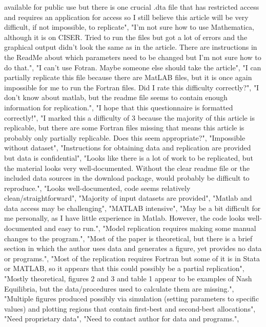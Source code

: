 \documentclass[]{article}
\begin{document}
\begin{itemize}
  available for public use but there is one crucial .dta file that has
  restricted access and requires an application for access so I still
  believe this article will be very difficult, if not impossible, to
  replicate", "I'm not sure how to use Mathematica, although it is on
  CISER. Tried to run the files but got a lot of errors and the
  graphical output didn't look the same as in the article. There are
  instructions in the ReadMe about which parameters need to be changed
  but I'm not sure how to do that.", "I can't use Fotran. Maybe someone
  else should take the article", "I can partially replicate this file
  because there are MatLAB files, but it is once again impossible for me
  to run the Fortran files. Did I rate this difficulty correctly?", "I
  don't know about matlab, but the readme file seems to contain enough
  information for replication.", "I hope that this questionnaire is
  formatted correctly!", "I marked this a difficulty of 3 because the
  majority of this article is replicable, but there are some Fortran
  files missing that means this article is probably only partially
  replicable. Does this seem appropriate?", "Impossible without
  dataset", "Instructions for obtaining data and replication are
  provided but data is confidential", "Looks like there is a lot of work
  to be replicated, but the material looks very well-documented. Without
  the clear readme file or the included data sources in the download
  package, would probably be difficult to reproduce.", "Looks
  well-documented, code seems relatively clean/straightforward",
  "Majority of input datasets are provided", "Matlab and data access may
  be challenging", "MATLAB intensive", "May be a bit difficult for me
  personally, as I have little experience in Matlab. However, the code
  looks well-documented and easy to run.", "Model replication requires
  making some manual changes to the program.", "Most of the paper is
  theoretical, but there is a brief section in which the author uses
  data and generates a figure, yet provides no data or programs.", "Most
  of the replication requires Fortran but some of it is in Stata or
  MATLAB, so it appears that this could possibly be a partial
  replication", "Mostly theoretical, figures 2 and 3 and table 1 appear
  to be examples of Nash Equilibria, but the data/procedures used to
  calculate them are missing.", "Multiple figures produced possibly via
  simulation (setting parameters to specific values) and plotting
  regions that contain first-best and second-best allocations", "Need
  proprietary data", "Need to contact author for data and programs.",

\end{itemize}
\end{document}
